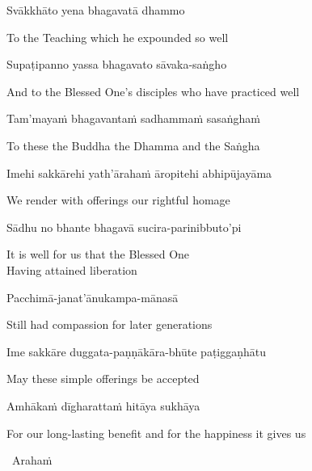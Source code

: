 Svākkhāto yena bhagavatā dhammo

\begin{english}
  To the Teaching which he expounded so well
\end{english}

Supaṭipanno yassa bhagavato sāvaka-saṅgho

\begin{english}
  And to the Blessed One's disciples who have practiced well
\end{english}

Tam'mayaṁ bhagavantaṁ sadhammaṁ sasaṅghaṁ

\begin{english}
  To these the Buddha the Dhamma and the Saṅgha
\end{english}

Imehi sakkārehi yath'ārahaṁ āropitehi abhipūjayāma

\begin{english}
  We render with offerings our rightful homage
\end{english}

Sādhu no bhante bhagavā sucira-parinibbuto'pi

\begin{english}
  It is well for us that the Blessed One\\
  Having attained liberation
\end{english}

Pacchimā-janat'ānukampa-mānasā

\begin{english}
  Still had compassion for later generations
\end{english}

Ime sakkāre duggata-paṇṇākāra-bhūte paṭiggaṇhātu

\begin{english}
  May these simple offerings be accepted
\end{english}

Amhākaṁ dīgharattaṁ hitāya sukhāya

\begin{english}
  For our long-lasting benefit and for the happiness it gives us
\end{english}

\ifafiveversion\clearpage\fi

\begin{leader}
  \anglebracketleft\ \hspace{-0.5mm}Arahaṁ \hspace{-0.5mm}\anglebracketright\
\end{leader}

